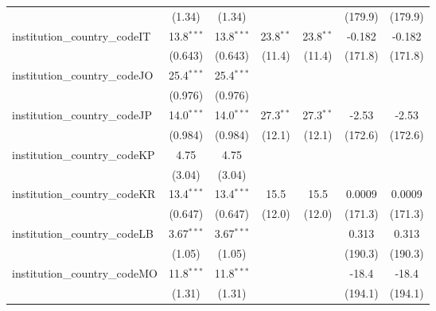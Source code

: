 \begin{tabular}{lcccccc}
                                         & (1.34)        & (1.34)        &               &               & (179.9)       & (179.9)\\   
   institution\_country\_codeIT          & 13.8$^{***}$  & 13.8$^{***}$  & 23.8$^{**}$   & 23.8$^{**}$   & -0.182        & -0.182\\   
                                         & (0.643)       & (0.643)       & (11.4)        & (11.4)        & (171.8)       & (171.8)\\   
   institution\_country\_codeJO          & 25.4$^{***}$  & 25.4$^{***}$  &               &               &               &   \\   
                                         & (0.976)       & (0.976)       &               &               &               &   \\   
   institution\_country\_codeJP          & 14.0$^{***}$  & 14.0$^{***}$  & 27.3$^{**}$   & 27.3$^{**}$   & -2.53         & -2.53\\   
                                         & (0.984)       & (0.984)       & (12.1)        & (12.1)        & (172.6)       & (172.6)\\   
   institution\_country\_codeKP          & 4.75          & 4.75          &               &               &               &   \\   
                                         & (3.04)        & (3.04)        &               &               &               &   \\   
   institution\_country\_codeKR          & 13.4$^{***}$  & 13.4$^{***}$  & 15.5          & 15.5          & 0.0009        & 0.0009\\   
                                         & (0.647)       & (0.647)       & (12.0)        & (12.0)        & (171.3)       & (171.3)\\   
   institution\_country\_codeLB          & 3.67$^{***}$  & 3.67$^{***}$  &               &               & 0.313         & 0.313\\   
                                         & (1.05)        & (1.05)        &               &               & (190.3)       & (190.3)\\   
   institution\_country\_codeMO          & 11.8$^{***}$  & 11.8$^{***}$  &               &               & -18.4         & -18.4\\   
                                         & (1.31)        & (1.31)        &               &               & (194.1)       & (194.1)\\   

\end{tabular}
